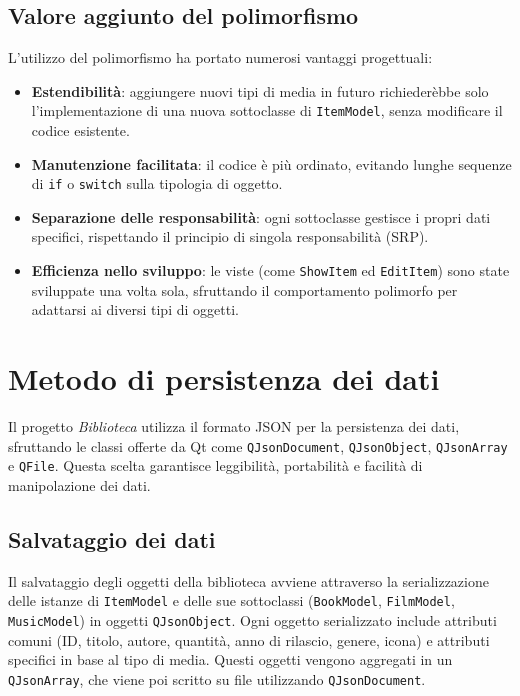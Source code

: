 \documentclass[a4paper,10pt]{article}
\begin{document}
\subsection{Valore aggiunto del polimorfismo}

L'utilizzo del polimorfismo ha portato numerosi vantaggi progettuali:
\begin{itemize}
    \item \textbf{Estendibilit\`a}: aggiungere nuovi tipi di media in futuro richieder\`ebbe solo l'implementazione di una nuova sottoclasse di \texttt{ItemModel}, senza modificare il codice esistente.
    \item \textbf{Manutenzione facilitata}: il codice \`e pi\`u ordinato, evitando lunghe sequenze di \texttt{if} o \texttt{switch} sulla tipologia di oggetto.
    \item \textbf{Separazione delle responsabilit\`a}: ogni sottoclasse gestisce i propri dati specifici, rispettando il principio di singola responsabilit\`a (SRP).
    \item \textbf{Efficienza nello sviluppo}: le viste (come \texttt{ShowItem} ed \texttt{EditItem}) sono state sviluppate una volta sola, sfruttando il comportamento polimorfo per adattarsi ai diversi tipi di oggetti.
\end{itemize}

\section{Metodo di persistenza dei dati}

Il progetto \textit{Biblioteca} utilizza il formato JSON per la persistenza dei dati, sfruttando le classi offerte da Qt come \texttt{QJsonDocument}, \texttt{QJsonObject}, \texttt{QJsonArray} e \texttt{QFile}. Questa scelta garantisce leggibilità, portabilità e facilità di manipolazione dei dati.

\subsection{Salvataggio dei dati}

Il salvataggio degli oggetti della biblioteca avviene attraverso la serializzazione delle istanze di \texttt{ItemModel} e delle sue sottoclassi (\texttt{BookModel}, \texttt{FilmModel}, \texttt{MusicModel}) in oggetti \texttt{QJsonObject}. Ogni oggetto serializzato include attributi comuni (ID, titolo, autore, quantità, anno di rilascio, genere, icona) e attributi specifici in base al tipo di media. Questi oggetti vengono aggregati in un \texttt{QJsonArray}, che viene poi scritto su file utilizzando \texttt{QJsonDocument}.
\end{document}
